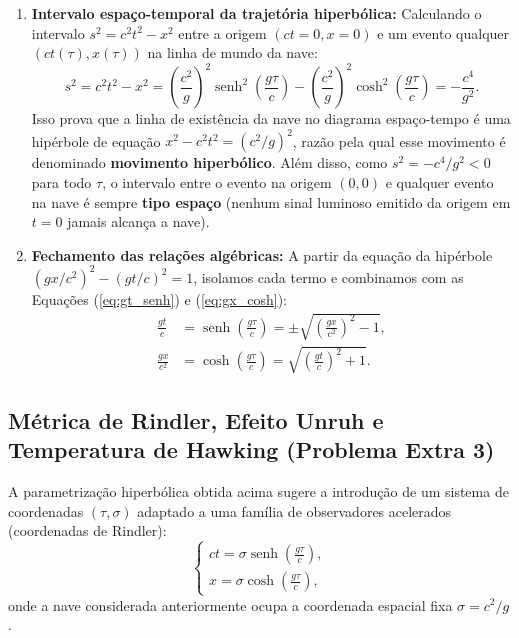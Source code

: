 \documentclass[11pt, a4paper]{article}
\begin{document}
\begin{enumerate}[label=\alph*)]
    \item \textbf{Intervalo espaço-temporal da trajetória hiperbólica:} Calculando o intervalo $s^2 = c^2 t^2 - x^2$ entre a origem $(ct = 0, x = 0)$ e um evento qualquer $(ct(\tau), x(\tau))$ na linha de mundo da nave:
    \begin{equation}
    s^2 = c^2 t^2 - x^2 = \left(\frac{c^2}{g}\right)^2 \operatorname{senh}^2\left(\frac{g \tau}{c}\right) - \left(\frac{c^2}{g}\right)^2 \cosh^2\left(\frac{g \tau}{c}\right) = -\frac{c^4}{g^2}.
    \end{equation}
    Isso prova que a linha de existência da nave no diagrama espaço-tempo é uma hipérbole de equação $x^2 - c^2 t^2 = (c^2/g)^2$, razão pela qual esse movimento é denominado \textbf{movimento hiperbólico}. Além disso, como $s^2 = -c^4/g^2 < 0$ para todo $\tau$, o intervalo entre o evento na origem $(0,0)$ e qualquer evento na nave é sempre \textbf{tipo espaço} (nenhum sinal luminoso emitido da origem em $t=0$ jamais alcança a nave).

    \item \textbf{Fechamento das relações algébricas:} A partir da equação da hipérbole $(gx/c^2)^2 - (gt/c)^2 = 1$, isolamos cada termo e combinamos com as Equações (\ref{eq:gt_senh}) e (\ref{eq:gx_cosh}):
    \begin{align}
    \frac{g t}{c} &= \operatorname{senh}\left(\frac{g \tau}{c}\right) = \pm \sqrt{\left(\frac{g x}{c^2}\right)^2 - 1}, \\
    \frac{g x}{c^2} &= \cosh\left(\frac{g \tau}{c}\right) = \sqrt{\left(\frac{g t}{c}\right)^2 + 1}.
    \end{align}
\end{enumerate}

\subsection{Métrica de Rindler, Efeito Unruh e Temperatura de Hawking (Problema Extra 3)}

A parametrização hiperbólica obtida acima sugere a introdução de um sistema de coordenadas $(\tau, \sigma)$ adaptado a uma família de observadores acelerados (coordenadas de Rindler):
\begin{equation}
\begin{cases}
ct = \sigma \operatorname{senh}\left(\frac{g \tau}{c}\right), \\
x = \sigma \cosh\left(\frac{g \tau}{c}\right),
\end{cases}
\end{equation}
onde a nave considerada anteriormente ocupa a coordenada espacial fixa $\sigma = c^2/g$.
\end{document}
